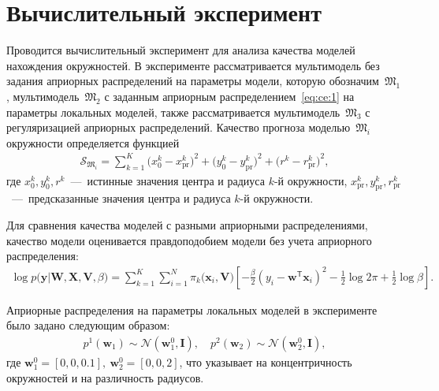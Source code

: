\documentclass[12pt, twoside]{article}
\numberwithin{equation}{section}
\begin{document}
\section{Вычислительный эксперимент}
Проводится вычислительный эксперимент для анализа качества моделей нахождения окружностей. В эксперименте рассматривается мультимодель без задания априорных распределений на параметры модели, которую обозначим~$\mathfrak{M}_1$, мультимодель~$\mathfrak{M}_2$ с заданным априорным распределением~\eqref{eq:ce:1} на параметры локальных моделей, также рассматривается мультимодель~$\mathfrak{M}_3$ с регуляризацией априорных распределений.
Качество прогноза моделью~$\mathfrak{M}_i$ окружности определяется функцией
\begin{equation}
\label{eq:ce:ex:0:1}
\begin{aligned}
\mathcal{S}_{\mathfrak{M}_i} = \sum_{k=1}^{K}\bigr(x^{k}_{0}-x^{k}_{\text{pr}}\bigr)^2+\bigr(y^{k}_{0}-y^{k}_{\text{pr}}\bigr)^2+\bigr(r^{k}-r^{k}_{\text{pr}}\bigr)^2,
\end{aligned}
\end{equation}
где $x^{k}_0, y^{k}_0, r^{k}$~---~истинные  значения центра и радиуса $k$-й окружности, $x^{k}_{\text{pr}}, y^{k}_{\text{pr}}, r^{k}_{\text{pr}}$~---~предсказанные значения центра и радиуса $k$-й окружности.

Для сравнения качества моделей с разными априорными распределениями, качество модели оценивается правдоподобием модели без учета априорного распределения:
\begin{equation}
\label{eq:ce:st:2:1}
\begin{aligned}
\log p\bigr(\mathbf{y}|\mathbf{W}, \mathbf{X}, \mathbf{V}, \beta\bigr) = \sum_{k=1}^{K}\sum_{i=1}^{N}\pi_{k}\bigr(\mathbf{x}_i, \mathbf{V}\bigr)\left[-\frac{\beta}{2}\left(y_i-\mathbf{w}^{\mathsf{T}}\mathbf{x}_i\right)^2-\frac{1}{2}\log{2\pi}+\frac{1}{2}\log\beta\right].
\end{aligned}
\end{equation}


Априорные распределения на параметры локальных моделей в эксперименте было задано следующим образом:
\begin{equation}
\label{eq:ce:1}
\begin{aligned}
p^{1}\left(\textbf{w}_1\right)\sim\mathcal{N}\left(\textbf{w}^{0}_{1}, \textbf{I}\right), \quad p^{2}\left(\textbf{w}_2\right)\sim\mathcal{N}\left(\textbf{w}^{0}_{2}, \textbf{I}\right),
\end{aligned}
\end{equation}
где $\textbf{w}^{0}_1 = [0, 0, 0.1],\ \textbf{w}^{0}_2 = [0, 0, 2]$, что указывает на концентричность окружностей и на различность радиусов.
\end{document}
